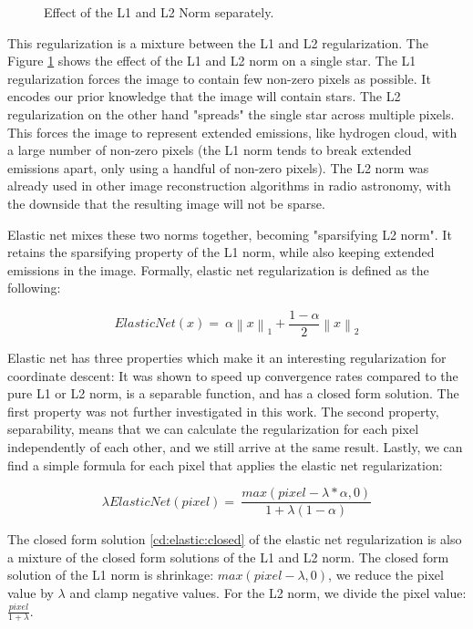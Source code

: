 \begin{figure}[h]
	\caption{Effect of the L1 and L2 Norm separately.}
	\label{cd:elastic}
\end{figure}


This regularization is a mixture between the L1 and L2 regularization. The Figure \ref{cd:elastic} shows the effect of the L1 and L2 norm on a single star. The L1 regularization forces the image to contain few non-zero pixels as possible. It encodes our prior knowledge that the image will contain stars. The L2 regularization on the other hand "spreads" the single star across multiple pixels. This forces the image to represent extended emissions, like hydrogen cloud, with a large number of non-zero pixels (the L1 norm tends to break extended emissions apart, only using a handful of non-zero pixels). The L2 norm was already used in other image reconstruction algorithms in radio astronomy\cite{ferrari2014distributed}, with the downside that the resulting image will not be sparse.

Elastic net mixes these two norms together, becoming "sparsifying L2 norm". It retains the sparsifying property of the L1 norm, while also keeping extended emissions in the image. Formally, elastic net regularization is defined as the following:

\begin{equation}\label{cd:elastic:formula}
ElasticNet(x) = \: \alpha \left \|x \right \|_1 + \frac{1-\alpha}{2}  \left \|x \right \|_2
\end{equation}

Elastic net has three properties which make it an interesting regularization for coordinate descent: It was shown to speed up convergence rates compared to the pure L1 or L2 norm\cite{friedman2010regularization}, is a separable function, and has a closed form solution. The first property was not further investigated in this work. The second property, separability, means that we can calculate the regularization for each pixel independently of each other, and we still arrive at the same result. Lastly, we can find a simple formula for each pixel that applies the elastic net regularization:

\begin{equation}\label{cd:elastic:closed}
\lambda ElasticNet(pixel) = \: \frac{max(pixel - \lambda * \alpha, 0)}{1+\lambda(1 - \alpha)}
\end{equation}

The closed form solution \eqref{cd:elastic:closed} of the elastic net regularization is also a mixture of the closed form solutions of the L1 and L2 norm. The closed form solution of the L1 norm is shrinkage: $max(pixel - \lambda, 0)$, we reduce the pixel value by $\lambda$ and clamp negative values. For the L2 norm, we divide the pixel value: $\frac{pixel}{1+\lambda}$.

